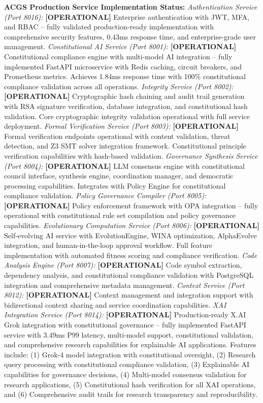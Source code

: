 \documentclass[manuscript,screen,9pt]{acmart}
\begin{document}
\textbf{ACGS Production Service Implementation Status:}
\textit{Authentication Service (Port 8016):} \textbf{[OPERATIONAL]} Enterprise authentication with JWT, MFA, and RBAC -- fully validated production-ready implementation with comprehensive security features, 0.43ms response time, and enterprise-grade user management.
\textit{Constitutional AI Service (Port 8001):} \textbf{[OPERATIONAL]} Constitutional compliance engine with multi-model AI integration -- fully implemented FastAPI microservice with Redis caching, circuit breakers, and Prometheus metrics. Achieves 1.84ms response time with 100\% constitutional compliance validation across all operations.
\textit{Integrity Service (Port 8002):} \textbf{[OPERATIONAL]} Cryptographic hash chaining and audit trail generation with RSA signature verification, database integration, and constitutional hash validation. Core cryptographic integrity validation operational with full service deployment.
\textit{Formal Verification Service (Port 8003):} \textbf{[OPERATIONAL]} Formal verification endpoints operational with content validation, threat detection, and Z3 SMT solver integration framework. Constitutional principle verification capabilities with hash-based validation.
\textit{Governance Synthesis Service (Port 8004):} \textbf{[OPERATIONAL]} LLM consensus engine with constitutional council interface, synthesis engine, coordination manager, and democratic processing capabilities. Integrates with Policy Engine for constitutional compliance validation.
\textit{Policy Governance Compiler (Port 8005):} \textbf{[OPERATIONAL]} Policy enforcement framework with OPA integration -- fully operational with constitutional rule set compilation and policy governance capabilities.
\textit{Evolutionary Computation Service (Port 8006):} \textbf{[OPERATIONAL]} Self-evolving AI service with EvolutionEngine, WINA optimization, AlphaEvolve integration, and human-in-the-loop approval workflow. Full feature implementation with automated fitness scoring and compliance verification.
\textit{Code Analysis Engine (Port 8007):} \textbf{[OPERATIONAL]} Code symbol extraction, dependency analysis, and constitutional compliance validation with PostgreSQL integration and comprehensive metadata management.
\textit{Context Service (Port 8012):} \textbf{[OPERATIONAL]} Context management and integration support with bidirectional context sharing and service coordination capabilities.
\textit{XAI Integration Service (Port 8014):} \textbf{[OPERATIONAL]} Production-ready X.AI Grok integration with constitutional governance -- fully implemented FastAPI service with 3.49ms P99 latency, multi-model support, constitutional validation, and comprehensive research capabilities for explainable AI applications. Features include: (1) Grok-4 model integration with constitutional oversight, (2) Research query processing with constitutional compliance validation, (3) Explainable AI capabilities for governance decisions, (4) Multi-model consensus validation for research applications, (5) Constitutional hash verification for all XAI operations, and (6) Comprehensive audit trails for research transparency and reproducibility.
\end{document}
